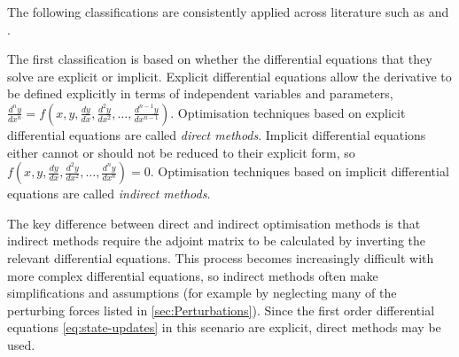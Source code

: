 

 The following classifications are consistently applied across literature such as \textcite{Betts1998} and \textcite{ASTOS_guide}.

The first classification is based on whether the differential equations that they solve are explicit or implicit.
Explicit differential equations allow the derivative to be defined explicitly in terms of independent variables and parameters, $\frac{d^ny}{dx^n}=f(x,y,\frac{dy}{dx},\frac{d^2y}{dx^2},\dots,\frac{d^{n-1}y}{dx^{n-1}})$. Optimisation techniques based on explicit differential equations are called \emph{direct methods}. Implicit differential equations either cannot or should not be reduced to their explicit form, so $f(x,y,\frac{dy}{dx},\frac{d^2y}{dx^2},\dots,\frac{d^{n}y}{dx^{n}})=0$. Optimisation techniques based on implicit differential equations are called \emph{indirect methods}.

The key difference between direct and indirect optimisation methods is that indirect methods require the adjoint matrix to be calculated by inverting the relevant differential equations. This process becomes increasingly difficult with more complex differential equations, so indirect methods often make simplifications and assumptions (for example by neglecting many of the perturbing forces listed in \autoref{sec:Perturbations}). Since the first order differential equations \eqref{eq:state-updates} in this scenario are explicit, direct methods may be used.

